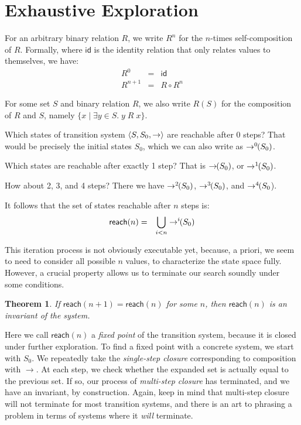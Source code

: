\documentclass{amsbook}
\newtheorem{theorem}{Theorem}[chapter]
\theoremstyle{definition}
\theoremstyle{remark}
\numberwithin{section}{chapter}
\numberwithin{equation}{chapter}
\begin{document}
\section{Exhaustive Exploration}

For an arbitrary binary relation $R$, we write $R^n$ for the $n$-times self-composition of $R$.
Formally, where $\mathsf{id}$ is the identity relation that only relates values to themselves, we have:
\begin{eqnarray*}
  R^0 &=& \mathsf{id} \\
  R^{n+1} &=& R \circ R^n
\end{eqnarray*}

For some set $S$ and binary relation $R$, we also write $R(S)$ for the composition of $R$ and $S$, namely $\{x \mid \exists y \in S. \; y \; R \; x\}$.

\newcommand{\ns}[0]{\hspace{-.05in}}

Which states of transition system ${\left \langle S, S_0, \to \right \rangle}$ are reachable after 0 steps?
That would be precisely the initial states $S_0$, which we can also write as $\to^0\ns(S_0)$.

Which states are reachable after exactly 1 step?
That is $\to\ns(S_0)$, or $\to^1\ns(S_0)$.

How about 2, 3, and 4 steps?
There we have $\to^2\ns(S_0)$, $\to^3\ns(S_0)$, and $\to^4\ns(S_0$).

It follows that the set of states reachable after $n$ steps is:
\begin{eqnarray*}
  \mathsf{reach}(n) &=& \bigcup_{i < n} \to^i\ns(S_0)
\end{eqnarray*}

This iteration process is not obviously executable yet, because, a priori, we seem to need to consider all possible $n$ values, to characterize the state space fully.
However, a crucial property allows us to terminate our search soundly under some conditions.

\begin{theorem}
  \invariants
  If $\mathsf{reach}(n+1) = \mathsf{reach}(n)$ for some $n$, then $\mathsf{reach}(n)$ is an invariant of the system.
\end{theorem}

Here we call $\mathsf{reach}(n)$ a \emph{fixed point} of the transition system, because it is closed under further exploration.
To find a fixed point with a concrete system, we start with $S_0$.
We repeatedly take the \emph{single-step closure} corresponding to composition with $\to$.
At each step, we check whether the expanded set is actually equal to the previous set.
If so, our process of \emph{multi-step closure} has terminated, and we have an invariant, by construction.
Again, keep in mind that multi-step closure will not terminate for most transition systems, and there is an art to phrasing a problem in terms of systems where it \emph{will} terminate.
\end{document}
